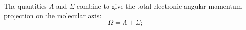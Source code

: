The quantities $\Lambda$ and $\Sigma$ combine to give the total electronic angular-momentum projection on the molecular axis:
\begin{equation}\Omega=\Lambda+\Sigma;\tag{83.1}\end{equation}
